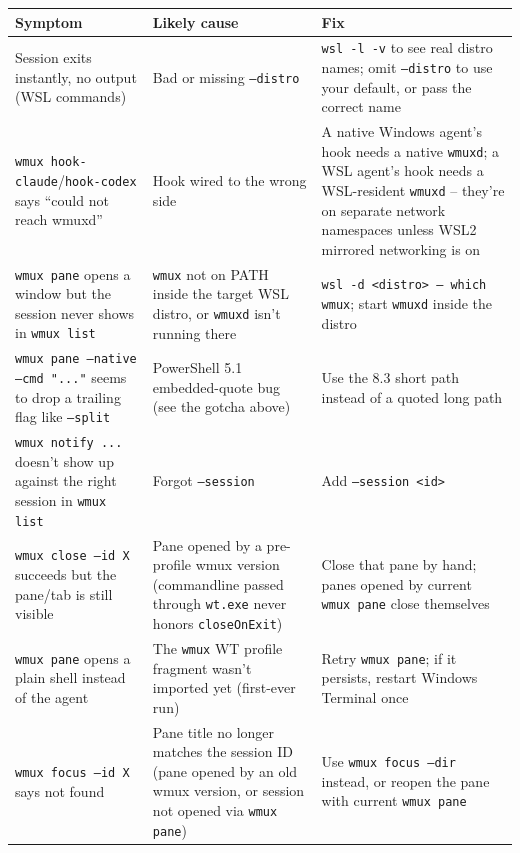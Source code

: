 \documentclass{article}
\begin{document}
\begin{tabular}{|p{4cm}|p{4.5cm}|p{6cm}|}
\hline
\textbf{Symptom} & \textbf{Likely cause} & \textbf{Fix} \\
\hline
Session exits instantly, no output (WSL commands) &
Bad or missing \texttt{--distro} &
\texttt{wsl -l -v} to see real distro names; omit \texttt{--distro} to use your default, or pass the correct name \\
\hline
\texttt{wmux hook-claude}/\texttt{hook-codex} says ``could not reach wmuxd'' &
Hook wired to the wrong side &
A native Windows agent's hook needs a native \texttt{wmuxd}; a WSL agent's hook needs a WSL-resident \texttt{wmuxd} -- they're on separate network namespaces unless WSL2 mirrored networking is on \\
\hline
\texttt{wmux pane} opens a window but the session never shows in \texttt{wmux list} &
\texttt{wmux} not on PATH inside the target WSL distro, or \texttt{wmuxd} isn't running there &
\texttt{wsl -d <distro> -- which wmux}; start \texttt{wmuxd} inside the distro \\
\hline
\texttt{wmux pane --native --cmd "..."} seems to drop a trailing flag like \texttt{--split} &
PowerShell 5.1 embedded-quote bug (see the gotcha above) &
Use the 8.3 short path instead of a quoted long path \\
\hline
\texttt{wmux notify ...} doesn't show up against the right session in \texttt{wmux list} &
Forgot \texttt{--session} &
Add \texttt{--session <id>} \\
\hline
\texttt{wmux close --id X} succeeds but the pane/tab is still visible &
Pane opened by a pre-profile wmux version (commandline passed through \texttt{wt.exe} never honors \texttt{closeOnExit}) &
Close that pane by hand; panes opened by current \texttt{wmux pane} close themselves \\
\hline
\texttt{wmux pane} opens a plain shell instead of the agent &
The \texttt{wmux} WT profile fragment wasn't imported yet (first-ever run) &
Retry \texttt{wmux pane}; if it persists, restart Windows Terminal once \\
\hline
\texttt{wmux focus --id X} says not found &
Pane title no longer matches the session ID (pane opened by an old wmux version, or session not opened via \texttt{wmux pane}) &
Use \texttt{wmux focus --dir} instead, or reopen the pane with current \texttt{wmux pane} \\
\hline
\end{tabular}
\end{document}
